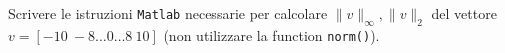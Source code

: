 Scrivere le istruzioni {\tt Matlab} necessarie per calcolare $\|v\|_\infty, \|v\|_2$ del vettore $v = [-10 \ -8 \ldots 0 \ldots 8 \ 10]$ (non utilizzare la function {\tt norm()}). 

